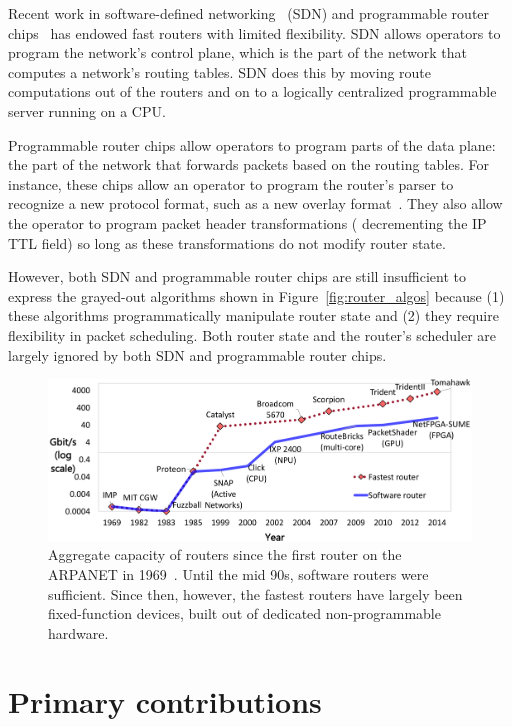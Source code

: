 Recent work in software-defined networking~\cite{sdn_history} (SDN) and
programmable router chips~\cite{rmt, xpliant, flexpipe} has endowed fast
routers with limited flexibility. SDN allows operators to program the network's
control plane, which is the part of the network that computes a network's
routing tables. SDN does this by moving route computations out of the routers
and on to a logically centralized programmable server running on a CPU.

Programmable router chips allow operators to program parts of the data plane:
the part of the network that forwards packets based on the routing tables. For
instance, these chips allow an operator to program the router's parser to
recognize a new protocol format, such as a new overlay format~\cite{nvgre}.
They also allow the operator to program packet header transformations (\eg
decrementing the IP TTL field) so long as these transformations do not modify
router state.

However, both SDN and programmable router chips are still insufficient to
express the grayed-out algorithms shown in Figure~\ref{fig:router_algos}
because (1) these algorithms programmatically manipulate router state and (2)
they require flexibility in packet scheduling.  Both router state and the
router's scheduler are largely ignored by both SDN and programmable router
chips.

\begin{figure}
\centering
\includegraphics[width=\columnwidth]{router_evolution.pdf}
\caption{Aggregate capacity of routers since the first router on the ARPANET in
1969~\cite{imp}. Until the mid 90s, software routers were sufficient. Since
then, however, the fastest routers have largely been fixed-function devices,
 built out of dedicated non-programmable hardware.}
\label{fig:router_evolution}
\end{figure}

\section{Primary contributions}


